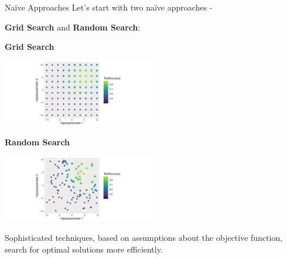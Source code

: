 \documentclass[11pt,compress,t,notes=noshow, xcolor=table]{beamer}
\begin{document}
\begin{vbframe}{Naïve Approaches}
Let's start with two naïve approaches -

\textbf{Grid Search} and \textbf{Random Search}:

\vspace{2em}
\begin{minipage}{0.51\textwidth}
\begin{center}
\textbf{Grid Search}
\end{center}

\includegraphics[width=190pt]{figure/cart_tuning_balgos_1.pdf}
\end{minipage}
\begin{minipage}{0.48\textwidth}
\begin{center}
\textbf{Random Search}
\end{center}

\includegraphics[width=190pt]{figure/cart_tuning_balgos_2.pdf}
\end{minipage}

\vspace{5em}
\small Sophisticated techniques, based on assumptions about the objective function, search for optimal solutions more efficiently.
\end{vbframe}
\end{document}
